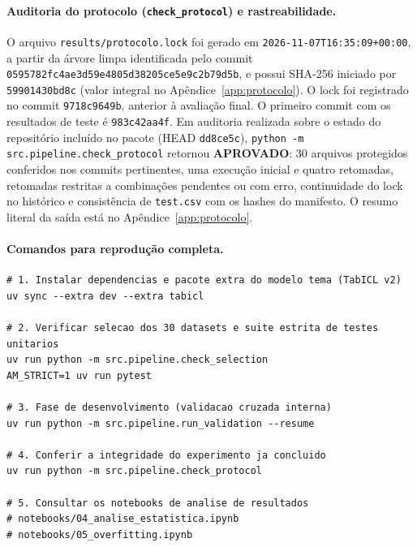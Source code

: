\documentclass[11pt,a4paper]{article}
\begin{document}
\paragraph{Auditoria do protocolo (\texttt{check\_protocol}) e rastreabilidade.}
O arquivo \texttt{results/protocolo.lock} foi gerado em \texttt{2026-11-07T16:35:09+00:00}, a partir da árvore limpa identificada pelo commit \texttt{0595782fc4ae3d59e4805d38205ce5e9c2b79d5b}, e possui SHA-256 iniciado por \texttt{59901430bd8c} (valor integral no Apêndice~\ref{app:protocolo}). O lock foi registrado no commit \texttt{9718c9649b}, anterior à avaliação final. O primeiro commit com os resultados de teste é \texttt{983c42aa4f}. Em auditoria realizada sobre o estado do repositório incluído no pacote (HEAD \texttt{dd8ce5c}), \texttt{python -m src.pipeline.check\_protocol} retornou \textbf{APROVADO}: 30 arquivos protegidos conferidos nos commits pertinentes, uma execução inicial e quatro retomadas, retomadas restritas a combinações pendentes ou com erro, continuidade do lock no histórico e consistência de \texttt{test.csv} com os hashes do manifesto. O resumo literal da saída está no Apêndice~\ref{app:protocolo}.

\paragraph{Comandos para reprodução completa.}
\begin{verbatim}
# 1. Instalar dependencias e pacote extra do modelo tema (TabICL v2)
uv sync --extra dev --extra tabicl

# 2. Verificar selecao dos 30 datasets e suite estrita de testes unitarios
uv run python -m src.pipeline.check_selection
AM_STRICT=1 uv run pytest

# 3. Fase de desenvolvimento (validacao cruzada interna)
uv run python -m src.pipeline.run_validation --resume

# 4. Conferir a integridade do experimento ja concluido
uv run python -m src.pipeline.check_protocol

# 5. Consultar os notebooks de analise de resultados
# notebooks/04_analise_estatistica.ipynb
# notebooks/05_overfitting.ipynb
\end{verbatim}
\end{document}
